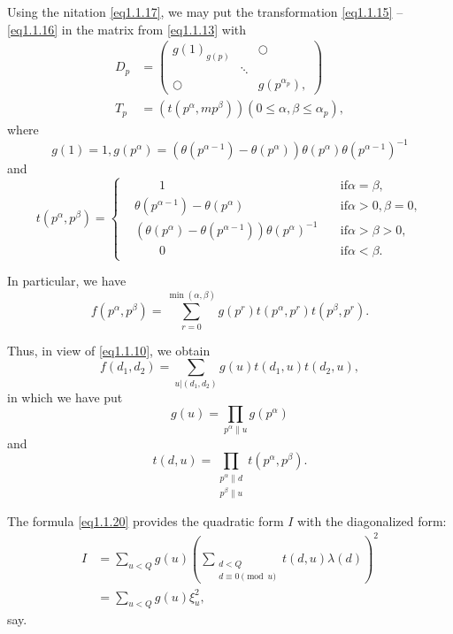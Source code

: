 Using the nitation  \eqref{eq1.1.17}, we may put the transformation
\eqref{eq1.1.15} -- \eqref{eq1.1.16} in the matrix from
\eqref{eq1.1.13} with  
$$
\begin{aligned}
  D_p &= 
  \begin{pmatrix}
    g(1)_{g(p)}&  & \bigcirc\\
    &\ddots & \\
    \bigcirc & & g(p^{\alpha_{p}}),
  \end{pmatrix}\\
  T_p &= (t( p^{\alpha},m p^{\beta})) (0 \leq \alpha, \beta \leq \alpha _p),
\end{aligned}
$$
where
\begin{equation*}
g(1) = 1, g (p ^{\alpha}) = (\theta(p^{\alpha-1})-\theta(p^\alpha))
\theta(p^\alpha)\theta(p^{\alpha-1})^{-1}  \tag{1.1.18} \label{eq1.1.18}
\end{equation*}
and
\begin{equation*}
  t(p^\alpha,p^\beta) =  
  \left\{
  \begin{alignedat}{2}
    &  \qquad  1  & &\text{if} \alpha = \beta,\\
    &\theta ( p^{\alpha-1}) - \theta(p^\alpha)\qquad & &\text{if} \alpha >
    0,  \beta = 0,\\ 
    & ( \theta(p^\alpha)- \theta (p^{\alpha-1}))\theta (p^\alpha)^{-1}~ &
    &\text{if} \alpha > \beta  > 0, \\ 
    &  \qquad 0 & &\text{if} \alpha < \beta. 
  \end{alignedat}
  \right. \tag{1.1.19}\label{eq1.1.19}
\end{equation*}\pageoriginale

In particular, we have
$$
f(p^\alpha, p^\beta) = \sum \limits^{\min(\alpha, \beta)}_{r = 0}
g(p^r) t(p^\alpha, p^r) t(p^\beta, p^r). 
$$

\noindent
Thus, in view of \eqref{eq1.1.10}, we obtain 
\begin{equation*}
f(d_1,d_2) = \sum_{u | (d_1,d_2)} g(u) t(d_1,u) t(d_2,u),
\tag{1.1.20}\label{eq1.1.20} 
\end{equation*}
in which we have put
\begin{equation*}
g(u) = \prod_{p^\alpha \| u} g(p^\alpha) \tag{1.1.21}\label{eq1.1.21}
\end{equation*}
and
$$
t(d,u) = \prod_{\substack{p^\alpha \| d \\p^\beta \| u}}t(p^\alpha,p^\beta).
$$

The formula \eqref{eq1.1.20} provides the quadratic form $I$ with the
diagonalized form: 
\begin{align*}
I &=  \sum_{u < Q} g(u) ( \sum_{\substack{d < Q \\ d \equiv 0
    \pmod{u}}} t(d,u) \lambda (d))^2 \\  
&= \sum_{u < Q} g(u) \xi ^2 _u,
\end{align*}
say.


